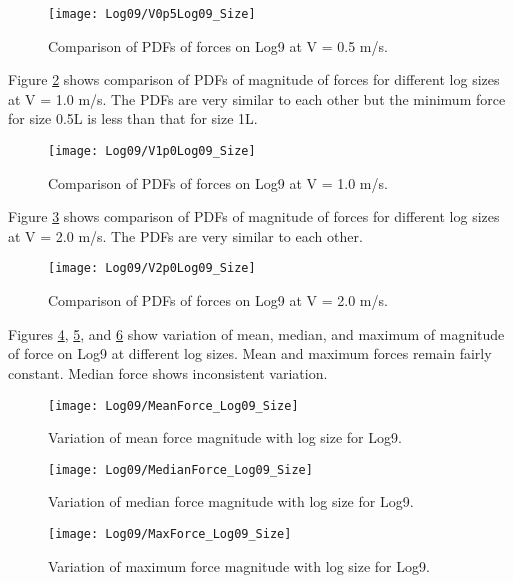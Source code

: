 \begin{figure}
\centering
\texttt{[image: Log09/V0p5Log09\_Size]}
\caption{\label{fig:V0p5Log09_Size}Comparison of PDFs of forces on Log9 at V = 0.5 m/s.}
\end{figure}

\noindent Figure \ref{fig:V1p0Log09_Size} shows comparison of PDFs of magnitude of forces for different log sizes at V = 1.0 m/s. The PDFs are very similar to each other but the minimum force for size 0.5L is less than that for size 1L.

\begin{figure}
\centering
\texttt{[image: Log09/V1p0Log09\_Size]}
\caption{\label{fig:V1p0Log09_Size}Comparison of PDFs of forces on Log9 at V = 1.0 m/s.}
\end{figure}

\noindent Figure \ref{fig:V2p0Log09_Size} shows comparison of PDFs of magnitude of forces for different log sizes at V = 2.0 m/s. The PDFs are very similar to each other.  

\begin{figure}
\centering
\texttt{[image: Log09/V2p0Log09\_Size]}
\caption{\label{fig:V2p0Log09_Size}Comparison of PDFs of forces on Log9 at V = 2.0 m/s.}
\end{figure}

\noindent Figures \ref{fig:MeanForce_Log09_Size}, \ref{fig:MedianForce_Log09_Size}, and \ref{fig:MaxForce_Log09_Size} show variation of mean, median, and maximum of magnitude of force on Log9 at different log sizes. Mean and maximum forces remain fairly constant. Median force shows inconsistent variation. 

\begin{figure}
\centering
\texttt{[image: Log09/MeanForce\_Log09\_Size]}
\caption{\label{fig:MeanForce_Log09_Size}Variation of mean force magnitude with log size for Log9.}
\end{figure}
\begin{figure}
\centering
\texttt{[image: Log09/MedianForce\_Log09\_Size]}
\caption{\label{fig:MedianForce_Log09_Size}Variation of median force magnitude with log size for Log9.}
\end{figure}
\begin{figure}
\centering
\texttt{[image: Log09/MaxForce\_Log09\_Size]}
\caption{\label{fig:MaxForce_Log09_Size}Variation of maximum force magnitude with log size for Log9.}
\end{figure}

